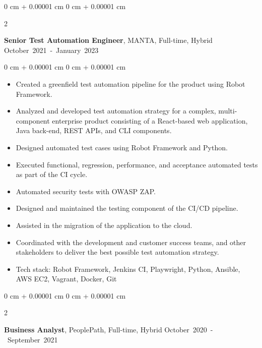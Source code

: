 \documentclass[10pt, a4paper]{article}
\newenvironment{highlights}{
    \begin{itemize}[
        topsep=0.10 cm,
        parsep=0.10 cm,
        partopsep=0pt,
        itemsep=0pt,
        leftmargin=0 cm + 10pt
    ]
}{
    \end{itemize}
} %
\newenvironment{onecolentry}{
    \begin{adjustwidth}{
        0 cm + 0.00001 cm
    }{
        0 cm + 0.00001 cm
    }
}{
    \end{adjustwidth}
} %
\newenvironment{twocolentry}[2][]{
    \onecolentry
    \def\secondColumn{#2}
    \setcolumnwidth{\fill, 4.5 cm}
    \begin{paracol}{2}
}{
    \switchcolumn \raggedleft \secondColumn
    \end{paracol}
    \endonecolentry
} %
\begin{document}
        \vspace{0.5 cm}

        \begin{twocolentry}{
            \small\mbox{October 2021 - January 2023}
        }
            \textbf{Senior Test Automation Engineer}, MANTA, Full-time, Hybrid\end{twocolentry}

        \vspace{0.10 cm}
        \begin{onecolentry}
            \begin{highlights}
                \item Created a greenfield test automation pipeline for the product using Robot Framework.
                \item Analyzed and developed test automation strategy for a complex, multi-component enterprise product consisting of a React-based web application, Java back-end, REST APIs, and CLI components.
                \item Designed automated test cases using Robot Framework and Python.
                \item Executed functional, regression, performance, and acceptance automated tests as part of the CI cycle.
                \item Automated security tests with OWASP ZAP.
                \item Designed and maintained the testing component of the CI/CD pipeline.
                \item Assisted in the migration of the application to the cloud.
                \item Coordinated with the development and customer success teams, and other stakeholders to deliver the best possible test automation strategy.
                \item Tech stack: Robot Framework, Jenkins CI, Playwright, Python, Ansible, AWS EC2, Vagrant, Docker, Git
            \end{highlights}
        \end{onecolentry}

        \vspace{0.5 cm}

        \begin{twocolentry}{
            \small\mbox{October 2020 - September 2021}
        }
            \textbf{Business Analyst}, PeoplePath, Full-time, Hybrid\end{twocolentry}
\end{document}
